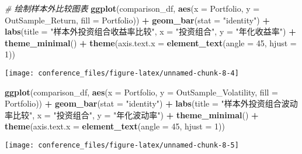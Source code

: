 \documentclass[
]{article}
\newenvironment{Shaded}{\begin{snugshade}}{\end{snugshade}}
\newcommand{\AttributeTok}[1]{\textcolor[rgb]{0.13,0.29,0.53}{#1}}
\newcommand{\CommentTok}[1]{\textcolor[rgb]{0.56,0.35,0.01}{\textit{#1}}}
\newcommand{\DecValTok}[1]{\textcolor[rgb]{0.00,0.00,0.81}{#1}}
\newcommand{\FunctionTok}[1]{\textcolor[rgb]{0.13,0.29,0.53}{\textbf{#1}}}
\newcommand{\NormalTok}[1]{#1}
\newcommand{\SpecialCharTok}[1]{\textcolor[rgb]{0.81,0.36,0.00}{\textbf{#1}}}
\newcommand{\StringTok}[1]{\textcolor[rgb]{0.31,0.60,0.02}{#1}}
\begin{document}
\begin{Shaded}
\begin{Highlighting}[]
\CommentTok{\# 绘制样本外比较图表}
\FunctionTok{ggplot}\NormalTok{(comparison\_df, }\FunctionTok{aes}\NormalTok{(}\AttributeTok{x =}\NormalTok{ Portfolio, }\AttributeTok{y =}\NormalTok{ OutSample\_Return, }\AttributeTok{fill =}\NormalTok{ Portfolio)) }\SpecialCharTok{+}
  \FunctionTok{geom\_bar}\NormalTok{(}\AttributeTok{stat =} \StringTok{"identity"}\NormalTok{) }\SpecialCharTok{+}
  \FunctionTok{labs}\NormalTok{(}\AttributeTok{title =} \StringTok{"样本外投资组合收益率比较"}\NormalTok{,}
       \AttributeTok{x =} \StringTok{"投资组合"}\NormalTok{,}
       \AttributeTok{y =} \StringTok{"年化收益率"}\NormalTok{) }\SpecialCharTok{+}
  \FunctionTok{theme\_minimal}\NormalTok{() }\SpecialCharTok{+}
  \FunctionTok{theme}\NormalTok{(}\AttributeTok{axis.text.x =} \FunctionTok{element\_text}\NormalTok{(}\AttributeTok{angle =} \DecValTok{45}\NormalTok{, }\AttributeTok{hjust =} \DecValTok{1}\NormalTok{))}
\end{Highlighting}
\end{Shaded}

\begin{center}\texttt{[image: conference\_files/figure-latex/unnamed-chunk-8-4]} \end{center}

\begin{Shaded}
\begin{Highlighting}[]
\FunctionTok{ggplot}\NormalTok{(comparison\_df, }\FunctionTok{aes}\NormalTok{(}\AttributeTok{x =}\NormalTok{ Portfolio, }\AttributeTok{y =}\NormalTok{ OutSample\_Volatility, }\AttributeTok{fill =}\NormalTok{ Portfolio)) }\SpecialCharTok{+}
  \FunctionTok{geom\_bar}\NormalTok{(}\AttributeTok{stat =} \StringTok{"identity"}\NormalTok{) }\SpecialCharTok{+}
  \FunctionTok{labs}\NormalTok{(}\AttributeTok{title =} \StringTok{"样本外投资组合波动率比较"}\NormalTok{,}
       \AttributeTok{x =} \StringTok{"投资组合"}\NormalTok{,}
       \AttributeTok{y =} \StringTok{"年化波动率"}\NormalTok{) }\SpecialCharTok{+}
  \FunctionTok{theme\_minimal}\NormalTok{() }\SpecialCharTok{+}
  \FunctionTok{theme}\NormalTok{(}\AttributeTok{axis.text.x =} \FunctionTok{element\_text}\NormalTok{(}\AttributeTok{angle =} \DecValTok{45}\NormalTok{, }\AttributeTok{hjust =} \DecValTok{1}\NormalTok{))}
\end{Highlighting}
\end{Shaded}

\begin{center}\texttt{[image: conference\_files/figure-latex/unnamed-chunk-8-5]} \end{center}
\end{document}

